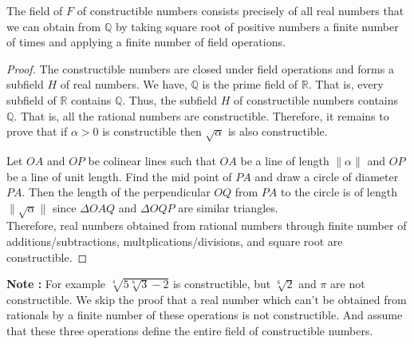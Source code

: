 \begin{theorem}
	The field of $F$ of constructible numbers consists {\color{blue}precisely} of all real numbers that we can obtain from $\mathbb{Q}$ by taking square root of positive numbers a finite number of times and applying a finite number of field operations.
\end{theorem}
\begin{proof}
	The constructible numbers are closed under field operations and forms a subfield $H$ of real numbers.
	We have, $\mathbb{Q}$ is the prime field of $\mathbb{R}$.
	That is, every subfield of $\mathbb{R}$ contains $\mathbb{Q}$.
	Thus, the subfield $H$ of constructible numbers contains $\mathbb{Q}$.
	That is, all the rational numbers are constructible.
	Therefore, it remains to prove that if $\alpha > 0$ is constructible then $\sqrt{\alpha}$ is also constructible.
\begin{center}
\end{center}

	Let $OA$ and $OP$ be colinear lines such that $OA$ be a line of length $\| \alpha \|$ and $OP$ be a line of unit length.
	Find the mid point of $PA$ and draw a circle of diameter $PA$.
	Then the length of the perpendicular $OQ$ from $PA$ to the circle is of length $\| \sqrt{\alpha} \|$ since $\Delta OAQ$ and $\Delta OQP$ are similar triangles.\\


	Therefore, real numbers obtained from rational numbers through finite number of additions/subtractions, multplications/divisions, and square root are constructible.
\end{proof}

\textbf{Note : } For example $\sqrt[4]{5\sqrt[8]{3}-2}$ is constructible, but $\sqrt[6]{2}$ and $\pi$ are not constructible.
We skip the proof that a real number which can't be obtained from rationals by a finite number of these operations is not constructible.
And assume that these three operations define the entire field of constructible numbers.

